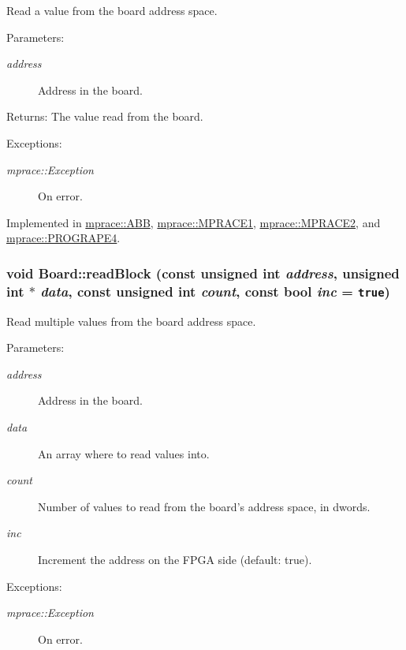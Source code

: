 Read a value from the board address space. 

\begin{Desc}
\item[Parameters:]
\begin{description}
\item[{\em address}]Address in the board. \end{description}
\end{Desc}
\begin{Desc}
\item[Returns:]The value read from the board. \end{Desc}
\begin{Desc}
\item[Exceptions:]
\begin{description}
\item[{\em mprace::Exception}]On error.\end{description}
\end{Desc}


Implemented in \hyperlink{classmprace_1_1ABB_a5}{mprace::ABB}, \hyperlink{classmprace_1_1MPRACE1_a3}{mprace::MPRACE1}, \hyperlink{classmprace_1_1MPRACE2_a3}{mprace::MPRACE2}, and \hyperlink{classmprace_1_1PROGRAPE4_a3}{mprace::PROGRAPE4}.\hypertarget{classmprace_1_1Board_a6}{
\subsubsection[readBlock]{\setlength{\rightskip}{0pt plus 5cm}void Board::read\-Block (const unsigned int {\em address}, unsigned int $\ast$ {\em data}, const unsigned int {\em count}, const bool {\em inc} = {\tt true})}}
\label{classmprace_1_1Board_a6}


Read multiple values from the board address space. 

\begin{Desc}
\item[Parameters:]
\begin{description}
\item[{\em address}]Address in the board. \item[{\em data}]An array where to read values into. \item[{\em count}]Number of values to read from the board's address space, in dwords. \item[{\em inc}]Increment the address on the FPGA side (default: true). \end{description}
\end{Desc}
\begin{Desc}
\item[Exceptions:]
\begin{description}
\item[{\em mprace::Exception}]On error.\end{description}
\end{Desc}


